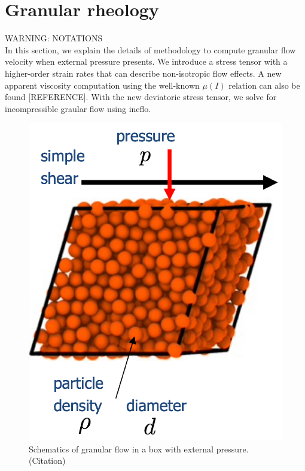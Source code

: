 \section{Granular rheology}
{\color{red}WARNING: NOTATIONS}
\\
In this section, we explain the details of methodology to compute granular flow velocity when external pressure presents. We introduce a stress tensor with a higher-order strain rates that can describe non-isotropic flow effects. A new apparent viscosity computation using the well-known $\mu(I)$ relation can also be found [{\color{blue}REFERENCE}]. With the new deviatoric stress tensor, we solve for incompressible graular flow using incflo. 
\begin{figure}[ht]
  \begin{center}
    \includegraphics[scale=0.4]{figures/fig_granular_ex.png}
    \end{center}
  \caption{Schematics of granular flow in a box with external pressure.({\color{red}Citation})}
  \label{fig_Laminar_shear}
\end{figure}

